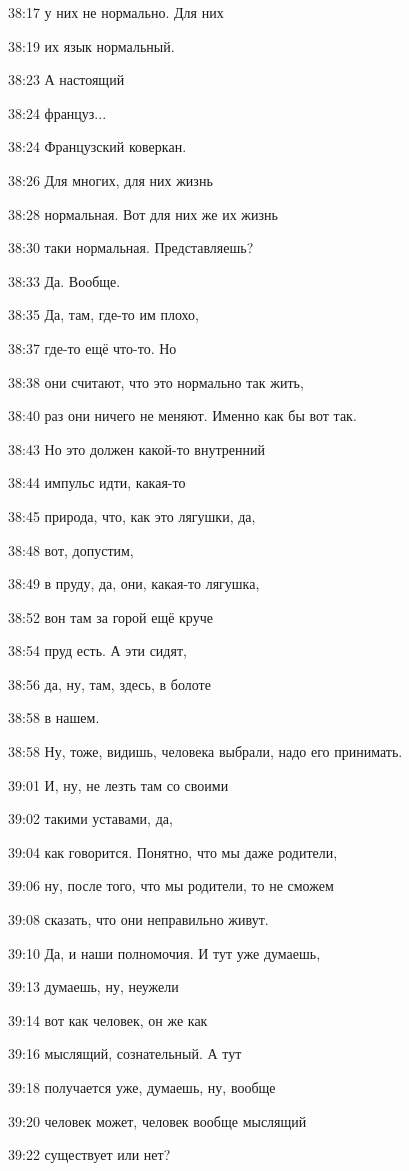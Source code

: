 38:17
у них не нормально. Для них

38:19
их язык нормальный.

38:23
А настоящий

38:24
француз...

38:24
Французский коверкан.

38:26
Для многих, для них жизнь

38:28
нормальная. Вот для них же их жизнь

38:30
таки нормальная. Представляешь?

38:33
Да. Вообще.

38:35
Да, там, где-то им плохо,

38:37
где-то ещё что-то. Но

38:38
они считают, что это нормально так жить,

38:40
раз они ничего не меняют. Именно как бы вот так.

38:43
Но это должен какой-то внутренний

38:44
импульс идти, какая-то

38:45
природа, что, как это лягушки, да,

38:48
вот, допустим,

38:49
в пруду, да, они, какая-то лягушка,

38:52
вон там за горой ещё круче

38:54
пруд есть. А эти сидят,

38:56
да, ну, там, здесь, в болоте

38:58
в нашем.

38:58
Ну, тоже, видишь, человека выбрали, надо его принимать.

39:01
И, ну, не лезть там со своими

39:02
такими уставами, да,

39:04
как говорится. Понятно, что мы даже родители,

39:06
ну, после того, что мы родители, то не сможем

39:08
сказать, что они неправильно живут.

39:10
Да, и наши полномочия. И тут уже думаешь,

39:13
думаешь, ну, неужели

39:14
вот как человек, он же как

39:16
мыслящий, сознательный. А тут

39:18
получается уже, думаешь, ну, вообще

39:20
человек может, человек вообще мыслящий

39:22
существует или нет?

